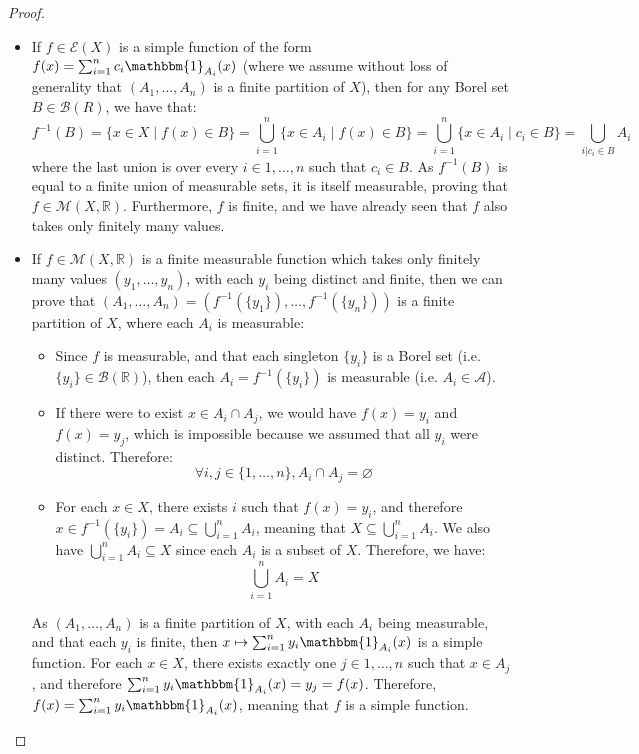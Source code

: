\documentclass{article}
\theoremstyle{definition}
\theoremstyle{remark}
\theoremstyle{example}
\theoremstyle{notation}
\begin{document}
\begin{proof}~
		\begin{itemize}
				\item If $f \in \mathcal{E}(X)$ is a simple function of the form $f(x) = \sum_{i=1}^n c_i \mathbbm{1}_{A_i}(x)$ (where we assume without loss of generality that $(A_1, \dots, A_n)$ is a finite partition of $X$), then for any Borel set $B \in \mathcal{B}(R)$, we have that:
						$$f^{-1}(B) = \{x \in X \mid f(x) \in B\} = \bigcup_{i=1}^n \{x \in A_i \mid f(x) \in B\} = \bigcup_{i=1}^n \{x \in A_i \mid c_i \in B\} = \bigcup_{i|c_i \in B} A_i$$
				where the last union is over every $i \in 1, \dots, n$ such that $c_i \in B$. As $f^{-1}(B)$ is equal to a finite union of measurable sets, it is itself measurable, proving that $f \in \mathcal{M}(X, \mathbb{R})$. Furthermore, $f$ is finite, and we have already seen that $f$ also takes only finitely many values.
		\item If $f \in \mathcal{M}(X, \mathbb{R})$ is a finite measurable function which takes only finitely many values $(y_1, \dots, y_n)$, with each $y_i$ being distinct and finite, then we can prove that $(A_1, \dots, A_n) = (f^{-1}(\{y_1\}), \dots, f^{-1}(\{y_n\}))$ is a finite partition of $X$, where each $A_i$ is measurable:
				\begin{itemize}
						\item Since $f$ is measurable, and that each singleton $\{y_i\}$ is a Borel set (i.e. $\{y_i\} \in \mathcal{B}(\mathbb{R})$), then each $A_i = f^{-1}(\{y_i\})$ is measurable (i.e. $A_i \in \mathcal{A}$).
						\item If there were to exist $x \in A_i \cap A_j$, we would have $f(x) = y_i$ and $f(x) = y_j$, which is impossible because we assumed that all $y_i$ were distinct. Therefore:
								$$\forall i, j \in \{1, \dots, n\}, A_i \cap A_j = \varnothing$$
						\item For each $x \in X$, there exists $i$ such that $f(x) = y_i$, and therefore $x \in f^{-1}(\{y_i\}) = A_i \subseteq \bigcup_{i=1}^n A_i$, meaning that $X \subseteq \bigcup_{i=1}^n A_i$. We also have $\bigcup_{i=1}^n A_i \subseteq X$ since each $A_i$ is a subset of $X$. Therefore, we have:
								$$\bigcup_{i=1}^n A_i = X$$
				\end{itemize}
				As $(A_1, \dots, A_n)$ is a finite partition of $X$, with each $A_i$ being measurable, and that each $y_i$ is finite, then $x \mapsto \sum_{i=1}^n y_i \mathbbm{1}_{A_i}(x)$ is a simple function. For each $x \in X$, there exists exactly one $j \in 1, \dots, n$ such that $x \in A_j$, and therefore $\sum_{i=1}^n y_i \mathbbm{1}_{A_i}(x) = y_j = f(x)$. Therefore, $f(x) = \sum_{i=1}^n y_i \mathbbm{1}_{A_i}(x)$, meaning that $f$ is a simple function.
		\end{itemize}
\end{proof}
\end{document}
